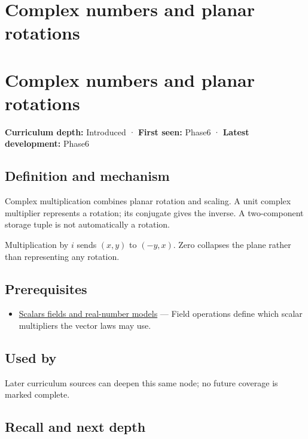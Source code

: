 \hypertarget{appendix-f77eadcc4a93}{}
\section*{Complex numbers and planar rotations}
\section{Complex numbers and planar rotations}\label{appendix-f77eadcc4a93-complex-numbers-and-planar-rotations}

\textbf{Curriculum depth:} Introduced · \textbf{First seen:} Phase6 · \textbf{Latest development:} Phase6

\subsection{Definition and mechanism}\label{appendix-f77eadcc4a93-definition-and-mechanism}

Complex multiplication combines planar rotation and scaling. A unit complex multiplier represents a rotation; its conjugate gives the inverse. A two-component storage tuple is not automatically a rotation.

Multiplication by \(i\) sends \((x,y)\) to \((-y,x)\). Zero collapses the plane rather than representing any rotation.

\subsection{Prerequisites}\label{appendix-f77eadcc4a93-prerequisites}

\begin{itemize}
\tightlist
\item
  \hyperref[appendix-52051ad550fe]{Scalars fields and real-number models} --- Field operations define which scalar multipliers the vector laws may use.
\end{itemize}

\subsection{Used by}\label{appendix-f77eadcc4a93-used-by}

Later curriculum sources can deepen this same node; no future coverage is marked complete.

\subsection{Recall and next depth}\label{appendix-f77eadcc4a93-recall-and-next-depth}

